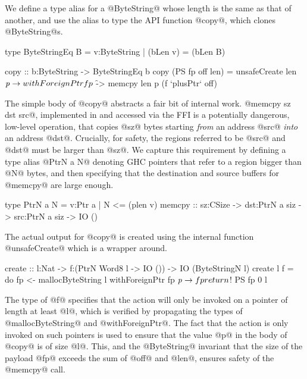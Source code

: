 We define a type alias for a @ByteString@ whose length is the same
as that of another, and use the alias to type the API 
function @copy@, which clones @ByteString@s.

\begin{code}
  type ByteStringEq B = {v:ByteString | (bLen v) = (bLen B)}
  
  copy :: b:ByteString -> ByteStringEq b 
  copy (PS fp off len) 
    = unsafeCreate len $ \mathit{p} -> 
        withForeignPtr fp $ \f ->
          memcpy len p (f `plusPtr` off) 
\end{code}

The simple body of @copy@ abstracts a fair bit of internal work. 
@memcpy sz dst src@, implemented in \C and accessed via the FFI is a potentially
dangerous, low-level operation, that copies @sz@ bytes starting
\emph{from} an address @src@ \emph{into} an address @dst@. 
Crucially, for safety, the regions referred to be @src@ and @dst@ 
must be larger than @sz@. We capture this requirement by defining
a type alias @PtrN a N@ denoting GHC pointers that refer to a region
bigger than @N@ bytes, and then specifying that the destination
and source buffers for @memcpy@ are large enough. 

\begin{code}
  type PtrN a N = {v:Ptr a | N <= (plen v)}
  memcpy :: sz:CSize -> dst:PtrN a siz 
                     -> src:PtrN a siz 
                     -> IO () 
\end{code}


The actual output for @copy@ is created using the 
internal function @unsafeCreate@ which is a wrapper around. 
\begin{code}
  create :: l:Nat -> f:(PtrN Word8 l -> IO ())
         -> IO (ByteStringN l)
  create l f = do
      fp <- mallocByteString l
      withForeignPtr fp $ \mathit{p} -> f p
      return $! PS fp 0 l
\end{code}

%
The type of @f@ specifies that the action
will only be invoked on a pointer of length at least 
@l@, which is verified by propagating the types of
@mallocByteString@ and @withForeignPtr@. 
%
The fact that the action is only invoked on such pointers 
is used to ensure that the value @p@ in the body of @copy@ 
is of size @l@. This, and the @ByteString@ 
invariant that the size of the payload @fp@ 
exceeds the sum of @off@ and @len@, ensures 
safety of the @memcpy@ call.

